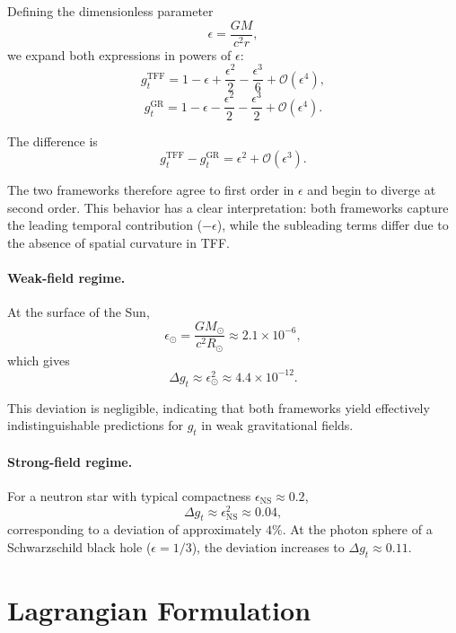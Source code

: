 \documentclass[12pt]{article}
\begin{document}
Defining the dimensionless parameter
\begin{equation}
\epsilon = \frac{GM}{c^2 r} ,
\end{equation}
we expand both expressions in powers of $\epsilon$:
$$
g_t^{\text{TFF}} = 1 - \epsilon + \frac{\epsilon^2}{2} - \frac{\epsilon^3}{6} + \mathcal{O}(\epsilon^4) ,
$$
$$
g_t^{\text{GR}} = 1 - \epsilon - \frac{\epsilon^2}{2} - \frac{\epsilon^3}{2} + \mathcal{O}(\epsilon^4) .
$$

The difference is
\begin{equation}
g_t^{\text{TFF}} - g_t^{\text{GR}} = \epsilon^2 + \mathcal{O}(\epsilon^3) .
\label{eq:gt_difference}
\end{equation}

The two frameworks therefore agree to first order in $\epsilon$ and begin to diverge at second order. This behavior has a clear interpretation: both frameworks capture the leading temporal contribution ($-\epsilon$), while the subleading terms differ due to the absence of spatial curvature in TFF.

\paragraph{Weak-field regime.}

At the surface of the Sun,
$$
\epsilon_\odot = \frac{GM_\odot}{c^2 R_\odot} \approx 2.1 \times 10^{-6} ,
$$
which gives
\begin{equation}
\Delta g_t \approx \epsilon_\odot^2 \approx 4.4 \times 10^{-12} .
\end{equation}

This deviation is negligible, indicating that both frameworks yield effectively indistinguishable predictions for $g_t$ in weak gravitational fields.

\paragraph{Strong-field regime.}

For a neutron star with typical compactness $\epsilon_{\text{NS}} \approx 0.2$,
\begin{equation}
\Delta g_t \approx \epsilon_{\text{NS}}^2 \approx 0.04 ,
\end{equation}
corresponding to a deviation of approximately $4\%$. At the photon sphere of a Schwarzschild black hole ($\epsilon = 1/3$), the deviation increases to $\Delta g_t \approx 0.11$.


\section{Lagrangian Formulation}
\label{sec:lagrangian}
\end{document}
